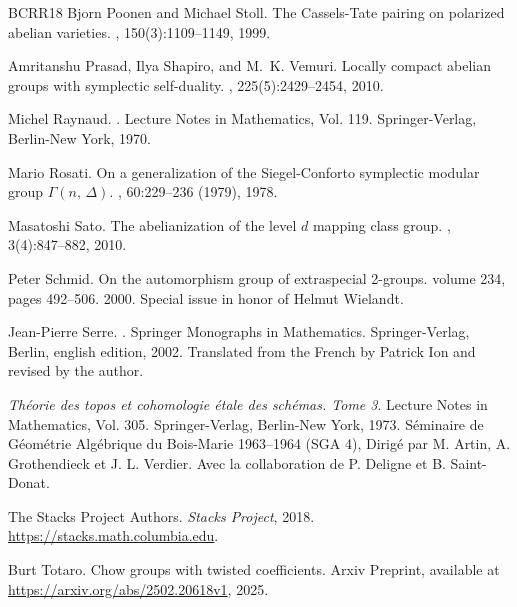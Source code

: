 \begin{thebibliography}{BCRR18}
Bjorn Poonen and Michael Stoll.
\newblock The {C}assels-{T}ate pairing on polarized abelian varieties.
, 150(3):1109--1149, 1999.

Amritanshu Prasad, Ilya Shapiro, and M.~K. Vemuri.
\newblock Locally compact abelian groups with symplectic self-duality.
, 225(5):2429--2454, 2010.

Michel Raynaud.
.
\newblock Lecture Notes in Mathematics, Vol. 119. Springer-Verlag, Berlin-New
  York, 1970.

Mario Rosati.
\newblock On a generalization of the {S}iegel-{C}onforto symplectic modular
  group {$\Gamma (n,\,\Delta )$}.
, 60:229--236 (1979), 1978.

Masatoshi Sato.
\newblock The abelianization of the level {$d$} mapping class group.
, 3(4):847--882, 2010.

Peter Schmid.
\newblock On the automorphism group of extraspecial 2-groups.
\newblock volume 234, pages 492--506. 2000.
\newblock Special issue in honor of Helmut Wielandt.

Jean-Pierre Serre.
.
\newblock Springer Monographs in Mathematics. Springer-Verlag, Berlin, english
  edition, 2002.
\newblock Translated from the French by Patrick Ion and revised by the author.

{\em Th\'{e}orie des topos et cohomologie \'{e}tale des sch\'{e}mas. {T}ome 3}.
\newblock Lecture Notes in Mathematics, Vol. 305. Springer-Verlag, Berlin-New
  York, 1973.
\newblock S\'{e}minaire de G\'{e}om\'{e}trie Alg\'{e}brique du Bois-Marie
  1963--1964 (SGA 4), Dirig\'{e} par M. Artin, A. Grothendieck et J. L.
  Verdier. Avec la collaboration de P. Deligne et B. Saint-Donat.

The {Stacks Project Authors}.
\newblock \textit{Stacks Project}, 2018.
\newblock \url{https://stacks.math.columbia.edu}.

Burt Totaro.
\newblock Chow groups with twisted coefficients.
\newblock Arxiv Preprint, available at
  \url{https://arxiv.org/abs/2502.20618v1}, 2025.


\end{thebibliography}
